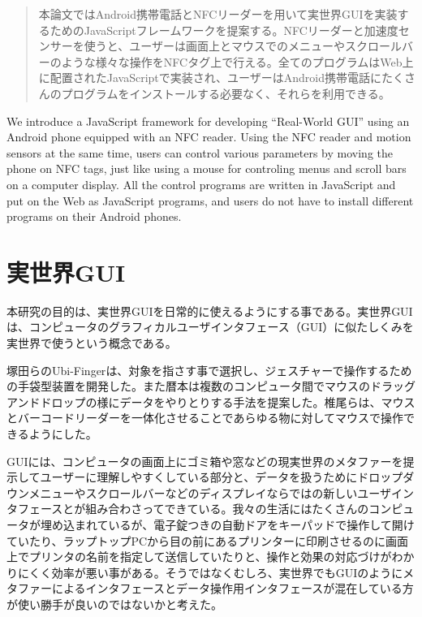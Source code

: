 
\begin{abstract}
本論文ではAndroid携帯電話とNFCリーダーを用いて実世界GUIを実装するためのJavaScriptフレームワークを提案する。NFCリーダーと加速度センサーを使うと、ユーザーは画面上とマウスでのメニューやスクロールバーのような様々な操作をNFCタグ上で行える。全てのプログラムはWeb上に配置されたJavaScriptで実装され、ユーザーはAndroid携帯電話にたくさんのプログラムをインストールする必要なく、それらを利用できる。
\end{abstract}

\begin{eabstract}
We introduce a JavaScript framework for developing ``Real-World GUI'' using an Android phone equipped with an NFC reader.  Using the NFC reader and motion sensors at the same time, users can control various parameters by moving the phone on NFC tags, just like using a mouse for controling menus and scroll bars on a computer display.  All the control programs are written in JavaScript and put on the Web as JavaScript programs, and users do not have to install different programs on their Android phones. 
\end{eabstract}

\maketitle

\section{実世界GUI}\label{sec:Introduction}
本研究の目的は、実世界GUI\cite{実世界GUI}を日常的に使えるようにする事である。実世界GUIは、コンピュータのグラフィカルユーザインタフェース（GUI）に似たしくみを実世界で使うという概念である。

塚田らのUbi-Finger\cite{Ubi-Finger}は、対象を指さす事で選択し、ジェスチャーで操作するための手袋型装置を開発した。また暦本は複数のコンピュータ間でマウスのドラッグアンドドロップの様にデータをやりとりする手法\cite{pick-and-drop}を提案した。椎尾らは、マウスとバーコードリーダーを一体化させることであらゆる物に対してマウスで操作できるようにした。\cite{field-mouse}

GUIには、コンピュータの画面上にゴミ箱や窓などの現実世界のメタファーを提示してユーザーに理解しやすくしている部分と、データを扱うためにドロップダウンメニューやスクロールバーなどのディスプレイならではの新しいユーザインタフェースとが組み合わさってできている。我々の生活にはたくさんのコンピュータが埋め込まれているが、電子錠つきの自動ドアをキーパッドで操作して開けていたり、ラップトップPCから目の前にあるプリンターに印刷させるのに画面上でプリンタの名前を指定して送信していたりと、操作と効果の対応づけがわかりにくく効率が悪い事がある。そうではなくむしろ、実世界でもGUIのようにメタファーによるインタフェースとデータ操作用インタフェースが混在している方が使い勝手が良いのではないかと考えた。

